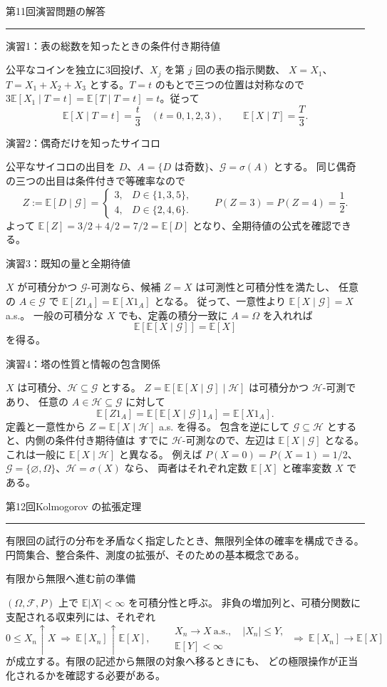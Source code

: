 \documentclass[a4paper,10pt,pdflatex,ja=standard,jafont=ipaex-type1,
  magstyle=real,scale=1]{bxjsarticle}
\newcommand{\coursename}{確率論と統計学 I}
\newcommand{\topic}[1]{\par\vspace{5pt}
  {\large\sffamily\mdseries\color{accent}#1}\par\vspace{2pt}}
\newcommand{\handouttitle}[1]{%
  \begin{center}
    {\Large\color{ink}#1}\par\vspace{3mm}
    {\color{accent}\rule{0.88\linewidth}{0.7pt}}
  \end{center}\vspace{-2mm}}
\newcommand{\keybox}[1]{\par\vspace{3pt}\begingroup
  \setlength{\fboxsep}{5pt}
  \colorbox{soft}{\parbox{\dimexpr\linewidth-2\fboxsep\relax}{#1}}%
  \endgroup\par\vspace{2pt}}
\newcommand{\F}{\mathcal F}
\newcommand{\E}{\mathbb E}
\newcommand{\ind}{\mathrm{1}}
\begin{document}
\fontsize{10pt}{13.5pt}\selectfont
\begingroup
\fancyhead[L]{\small\color{ink}\coursename{}・前回の演習解答}
\handouttitle{第11回\quad 演習問題の解答}

\topic{演習1：表の総数を知ったときの条件付き期待値}
公平なコインを独立に3回投げ、$X_j$ を第 $j$ 回の表の指示関数、
$X=X_1$、$T=X_1+X_2+X_3$ とする。$T=t$ のもとで三つの位置は対称なので
$3\E[X_1\mid T=t]=\E[T\mid T=t]=t$。従って
$$
  \E[X\mid T=t]=\frac t3\quad(t=0,1,2,3),\qquad
  \E[X\mid T]=\frac T3.
$$

\topic{演習2：偶奇だけを知ったサイコロ}
公平なサイコロの出目を $D$、$A=\{D\text{ は奇数}\}$、$\mathcal G=\sigma(A)$ とする。
同じ偶奇の三つの出目は条件付きで等確率なので
$$
  Z:=\E[D\mid\mathcal G]
    =\begin{cases}3,&D\in\{1,3,5\},\\4,&D\in\{2,4,6\}.
      \end{cases}
  \qquad P(Z=3)=P(Z=4)=\frac12.
$$
よって $\E[Z]=3/2+4/2=7/2=\E[D]$ となり、全期待値の公式を確認できる。

\topic{演習3：既知の量と全期待値}
$X$ が可積分かつ $\mathcal G$-可測なら、候補 $Z=X$ は可測性と可積分性を満たし、
任意の $A\in\mathcal G$ で $\E[Z\ind_A]=\E[X\ind_A]$ となる。
従って、一意性より $\E[X\mid\mathcal G]=X$ a.s.。
一般の可積分な $X$ でも、定義の積分一致に $A=\Omega$ を入れれば
$$\E[\E[X\mid\mathcal G]]=\E[X]$$
を得る。

\topic{演習4：塔の性質と情報の包含関係}
$X$ は可積分、$\mathcal H\subseteq\mathcal G$ とする。
$Z=\E[\E[X\mid\mathcal G]\mid\mathcal H]$ は可積分かつ $\mathcal H$-可測であり、
任意の $A\in\mathcal H\subseteq\mathcal G$ に対して
$$
  \E[Z\ind_A]=\E[\E[X\mid\mathcal G]\ind_A]=\E[X\ind_A].
$$
定義と一意性から $Z=\E[X\mid\mathcal H]$ a.s. を得る。
包含を逆にして $\mathcal G\subseteq\mathcal H$ とすると、内側の条件付き期待値は
すでに $\mathcal H$-可測なので、左辺は $\E[X\mid\mathcal G]$ となる。
これは一般に $\E[X\mid\mathcal H]$ と異なる。
例えば $P(X=0)=P(X=1)=1/2$、$\mathcal G=\{\varnothing,\Omega\}$、$\mathcal H=\sigma(X)$ なら、
両者はそれぞれ定数 $\E[X]$ と確率変数 $X$ である。
\clearpage
\endgroup

\handouttitle{第12回\quad Kolmogorov の拡張定理}
\keybox{有限回の試行の分布を矛盾なく指定したとき、無限列全体の確率を構成できる。
円筒集合、整合条件、測度の拡張が、そのための基本概念である。}

\topic{有限から無限へ進む前の準備}
$(\Omega,\F,P)$ 上で $\E|X|<\infty$ を可積分性と呼ぶ。
非負の増加列と、可積分関数に支配される収束列には、それぞれ
$$
  0\le X_n\uparrow X\ \Longrightarrow\ \E[X_n]\uparrow\E[X],
  \qquad
  \begin{gathered}X_n\to X\ \text{a.s.},\quad |X_n|\le Y,\\ \E[Y]<\infty\end{gathered}
  \ \Longrightarrow\ \E[X_n]\to\E[X]
$$
が成立する。有限の記述から無限の対象へ移るときにも、
どの極限操作が正当化されるかを確認する必要がある。
\end{document}
